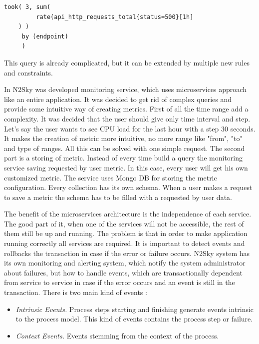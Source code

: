 \begin{lstlisting}[caption=Prometheus alerting rule]
    took( 3, sum(
         rate(api_http_requests_total{status=500}[1h]
    ) )
     by (endpoint)
     )
\end{lstlisting}

This query is already complicated, but it can be extended by multiple new rules and constraints. 

In N2Sky was developed monitoring service, which uses microservices approach like an entire application. It was decided to get rid of complex queries and provide some intuitive way of creating metrics. 
First of all the time range add a complexity. It was decided that the user should give only time interval and step. Let's say the user wants to see CPU load for the last hour with a step 30 seconds. It makes the creation of metric more intuitive, no more range like "from", "to" and type of ranges. All this can be solved with one simple request. 
The second part is a storing of metric. Instead of every time build a query the monitoring service saving requested by user metric. In this case, every user will get his own customized metric. 
The service uses Mongo DB for storing the metric configuration. Every collection has its own schema. When a user makes a request to save a metric the schema has to be filled with a requested by user data.


The benefit of the microservices architecture is the independence of each service. The good part of it, when one of the services will not be accessible, the rest of them still be up and running. The problem is that in order to make application running correctly all services are required. It is important to detect events and rollbacks the transaction in case if the error or failure occurs. N2Sky system has its own monitoring and alerting system, which notify the system administrator about failures, but how to handle events, which are transactionally dependent from service to service in case if the error occurs and an event is still in the transaction. There is two main kind of events \cite{cs5366}: 

\begin{itemize}
\item \emph{Intrinsic Events.} Process steps starting and finishing generate events intrinsic to the process model. This kind of events contains the process step or failure. 
\item \emph{Context Events.} Events stemming from the context of the process.
\end{itemize}

